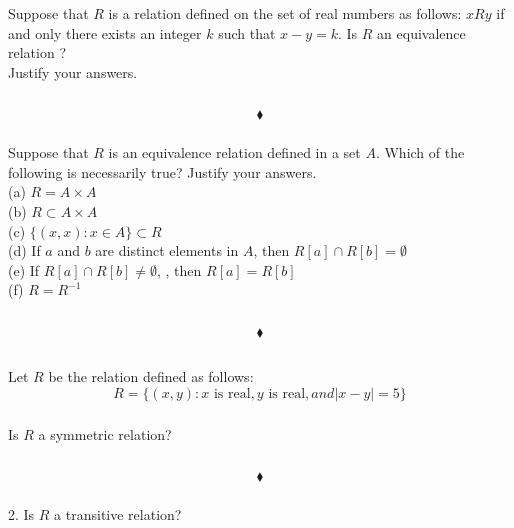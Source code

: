 \subsubsection{}
\begin{tcolorbox}
Suppose that $R$ is a relation defined on the set of real numbers  as follows: $xRy$ if and only there exists an integer $k$ such that $x-y=k$. Is $R$ an equivalence relation ?\\
Justify your answers.
\end{tcolorbox}
$$ $$

$$\blacklozenge$$
\subsubsection{}
\begin{tcolorbox}
Suppose that $R$  is an equivalence relation defined in a set $A$. Which of the following is necessarily true? Justify your answers.\\
(a) $R=A\times A$\\
(b) $R\subset  A \times A$ \\
(c) $\{(x, x):x \in  A\}\subset R$\\
(d) If $a$ and $b$ are distinct elements in $A$, then $R[a]\cap R[b] =\emptyset $\\
(e) If $R[a] \cap  R[b] \neq \emptyset$, , then $R[a]=R[b]$\\
(f) $R= R^{-1}$
\end{tcolorbox}
$$ $$

$$\blacklozenge$$

\renewcommand{\thesubsection}{\thesection.\RomanNumeralCaps{4}}
\subsection{}
Let $R$ be the relation defined as follows: 
$$R = \{(x, y):x \text{ is real}, y \text{ is real}, and |x - y| =5\} $$

\subsubsection{}
\begin{tcolorbox}
Is $R$ a symmetric relation? 
\end{tcolorbox}
$$ $$
 
$$\blacklozenge$$
\subsubsection{}
\begin{tcolorbox}

2. Is $R$ a transitive relation? 
\end{tcolorbox}
$$ $$
 
